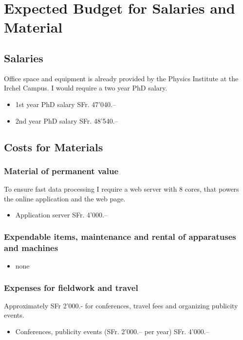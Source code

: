 \documentclass[12pt]{article}
\begin{document}
\pagestyle{empty}

\newpage

\section*{Expected Budget for Salaries and Material}

\subsection{Salaries}
Office space and equipment is already provided by the Physics Institute at the Irchel Campus.
I would require a two year PhD salary.

\begin{itemize}
	\item 1st year PhD salary \hfill SFr. 47'040.--
	\item 2nd year PhD salary \hfill SFr. 48'540.--
\end{itemize}


\subsection{Costs for Materials}

\subsubsection{Material of permanent value}
To ensure fast data processing I require a web server with 8 cores, that powers the online application and the web page.
\begin{itemize}
	\item Application server \hfill SFr. 4'000.--
\end{itemize}

\subsubsection{Expendable items, maintenance and rental of apparatuses and machines}
\begin{itemize}
	\item none
\end{itemize}


\subsubsection{Expenses for fieldwork and travel}
Approximately SFr 2'000.- for conferences, travel fees and organizing publicity events.
\begin{itemize}
	\item Conferences, publicity events (SFr. 2'000.-- per year) \hfill SFr. 4'000.--
\end{itemize}
\end{document}
